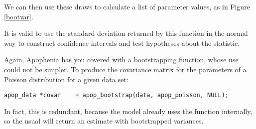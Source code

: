 
We can then use these draws to calculate a list of parameter values, as in Figure \ref{bootvar}.

It is valid to use the standard deviation returned by this function 
in the normal way to construct confidence intervals and test
hypotheses about the statistic.

Again, Apophenia has you covered with a bootstrapping function, whose
use could not be simpler. To produce the covariance matrix for the
parameters of a Poisson distribution for a given data set:
\begin{lstlisting}
apop_data *covar    = apop_bootstrap(data, apop_poisson, NULL);
\end{lstlisting}
In fact, this is redundant, because the 
model already uses the  function internally,
so the usual 
will return an estimate with bootstrapped variances.

